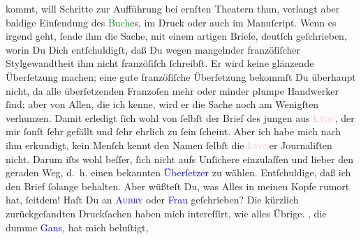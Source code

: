                   {\pb}kommt, will Schritte zur Aufführung bei ernſten
               Theatern thun, verlangt aber baldige Einſendung des \textcolor{green}{Buch}{}es, im  Druck oder
               auch im Manuſcript. Wenn es irgend geht, ſende ihm die Sache, mit einem artigen
               Briefe, deutſch geſchrieben, worin Du Dich entſchuldigſt, daß Du wegen mangelnder
               franzöſiſcher Stylgewandtheit ihm nicht franzöſiſch ſchreibſt. Er wird keine
               glänzende Überſetzung machen; eine gute franzöſiſche Überſetzung bekommſt Du
               überhaupt nicht, da alle überſetzenden Franzoſen mehr oder minder plumpe Handwerker
               ſind; aber von Allen, die ich kenne, {\pb}wird er die
               Sache noch am Wenigſten verhunzen. Damit erledigt ſich wohl von ſelbſt der Brief des
               jungen \label{K_L02758-2v}\label{K_L02758-2h} aus \textsc{\textcolor{pink}{Lyon}{}\ledrightnote{\textcolor{pink}{Lyon}}}, der mir ſonſt ſehr gefällt und ſehr ehrlich zu ſein ſcheint. Aber ich habe
               mich nach ihm erkundigt, kein Menſch kennt den Namen ſelbſt die \textsc{\textcolor{pink}{Lyon}{}\ledrightnote{\textcolor{pink}{Lyon}}}er Journaliſten nicht.  Darum iſts wohl beſſer, ſich nicht aufs Unſichere einzulaſſen und lieber den
               geraden Weg, d. h. einen bekannten \textcolor{blue}{Überſetzer}{} zu wählen. Entſchuldige, daß ich den Brief ſolange behalten. Aber
               wüßteſt Du, was Alles in meinen Kopfe rumort hat, ſeitdem!\pend
           \pstart
           {\pb}Haſt Du an \textsc{\textcolor{blue}{Aubry}{}\ledrightnote{\textcolor{blue}{Georges Aubry}}} oder \textcolor{blue}{Frau}{}
               geſchrieben?\pend
           \pstart
           Die kürzlich zurückgeſandten Druckſachen haben mich intereſſirt, wie alles Übrige.
                  \label{K_L02758-22v}\label{K_L02758-22h}, die dumme \textcolor{blue}{Gans}{}, hat mich beluſtigt,

